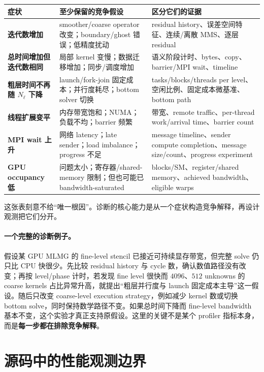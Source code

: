 \begin{center}
\small
\begin{tabularx}{0.98\textwidth}{>{\bfseries}p{2.8cm}p{4.0cm}X}
\toprule
症状 & 至少保留的竞争假设 & 区分它们的证据\\
\midrule
迭代数增加 &
smoother/coarse operator 改变；boundary/ghost 错误；低精度扰动 &
residual history、误差空间特征、连续/离散 MMS、逐层 residual\\
总时间增加但迭代数相同 &
局部 kernel 变慢；数据迁移增加；同步/调度增加 &
语义阶段计时、bytes、copy、barrier/MPI wait、timeline\\
粗层时间不再随 $N_\ell$ 下降 &
launch/fork-join 固定成本；并行度耗尽；bottom solver 切换 &
tasks/blocks/threads per level、空闲比例、固定成本微基准、bottom path\\
线程扩展变平 &
内存带宽饱和；NUMA；负载不均；barrier 频繁 &
带宽、remote traffic、per-thread work/arrival time、barrier count\\
MPI wait 上升 &
网络 latency；late sender；load imbalance；progress 不足 &
message timeline、sender compute completion、message size/count、progress experiment\\
GPU occupancy 低 &
问题太小；寄存器/shared-memory 限制；但也可能已 bandwidth-saturated &
blocks/SM、register/shared memory、achieved bandwidth、eligible warps\\
\bottomrule
\end{tabularx}
\end{center}

这张表刻意不给“唯一根因”。诊断的核心能力是从一个症状构造竞争解释，再设计观测把它们分开。


\paragraph{一个完整的诊断例子。}
假设某 GPU MLMG 的 fine-level stencil 已接近可持续显存带宽，但完整 solve 仍只比 CPU 快很少。先比较 residual history 与 cycle 数，确认数值路径没有改变；再按 level/phase 计时，若发现 fine level 很快而 $4096$、$512$ unknowns 的 coarse kernels 占比异常升高，就提出“粗层并行度与 launch 固定成本主导”这一假设。随后只改变 coarse-level execution strategy，例如减少 kernel 数或切换 bottom solve，同时保持数学路径不变。如果总时间下降而 fine-level bandwidth 基本不变，这个实验才真正支持原假设。这里的关键不是某个 profiler 指标本身，而是\textbf{每一步都在排除竞争解释}。

\section{源码中的性能观测边界}

